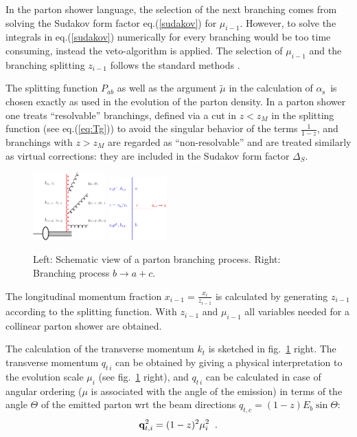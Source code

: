 \documentclass[11pt]{article} \usepackage{mystyle-new}
\newcommand{\as}{\ensuremath{\alpha_\mathrm{s}}}
\def\prp{t}
\newcommand{\kt}{k_{t}}
\def\kt{\ensuremath{k_{\prp}}}
\begin{document}
In the parton shower language, the selection of the next branching comes from solving the Sudakov form factor eq.(\ref{sudakov}) for $\mu_{i-1}$.
However, to solve the integrals in eq.(\ref{sudakov}) numerically for every branching would be too time consuming, instead the veto-algorithm \cite{Bengtsson:1986gz,Platzer:2011dq} is applied. The selection of $\mu_{i-1}$ and the branching splitting $z_{i-1}$ follows the standard methods \cite{Bengtsson:1986gz}. 

The splitting function $P_{ab}$ as well as the argument $\tilde \mu$ in the calculation of \as\ is chosen exactly as used in the evolution of the parton density. In a parton shower one treats ``resolvable'' branchings, defined via a cut in $z < z_M$ in the splitting function  (see eq.(\ref{eq:Tg})) to avoid the singular behavior of the terms $\frac{1}{1-z}$, and branchings with $z> z_M$ are regarded as ``non-resolvable'' and are treated similarly as virtual corrections: they are included in the Sudakov form factor $\Delta_S $. 

\begin{figure}[htb]
\begin{center} 
\includegraphics[width=0.25\textwidth]{parton-shower-evolution-crop} \hskip 2cm
\includegraphics[width=0.2\textwidth]{splitting-process-latex-crop} 
  \caption{Left: Schematic view of a parton branching process. Right: Branching process $ b \to a + c$.}
\label{parton-branching}
\end{center}
\end{figure} 

The longitudinal momentum fraction $x_{i-1}= \frac{x_i}{z_{i-1}}$ is calculated by generating $z_{i-1}$ according to the splitting function. With $z_{i-1}$ and $\mu_{i-1}$ all variables needed for a collinear parton shower are obtained. 

The calculation of the  transverse momentum $\kt$ is sketched in fig.~\ref{parton-branching} right.
The transverse momentum $q_{t\,i}$ can be  obtained by giving a physical interpretation to the evolution scale $\mu_i$ (see fig.~\ref{parton-branching} right), and $q_{t\,i}$ can be calculated in case of angular ordering ($\mu$ is associated with the angle of the emission)  in terms of the angle $\Theta$ of the emitted parton wrt the beam directions $q_{t,c} = (1-z) E_{b} \sin \Theta$:
\begin{equation}
  \label{ang-ordering}
 {\bf q}_{t,i}^2  =  (1-z)^2 \mu_i^ 2  \;\; .
\end{equation}
\end{document}
